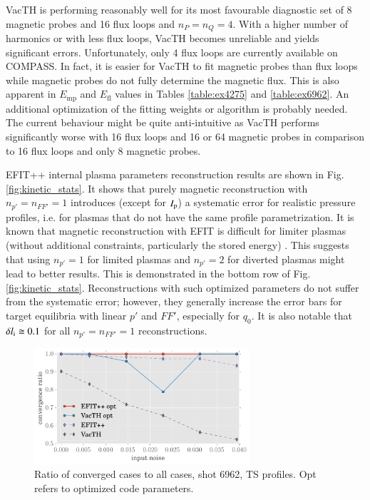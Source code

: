 VacTH is performing reasonably well for its most favourable diagnostic set of 8 magnetic probes and 16 flux loops and $n_P = n_Q = 4$. With a higher number of harmonics or with less flux loops, VacTH becomes unreliable and yields significant errors. Unfortunately, only 4 flux loops are currently available on COMPASS. In fact, it is easier for VacTH to fit magnetic probes than flux loops while magnetic probes do not fully determine the magnetic flux. This is also apparent in $E_\mathrm{mp}$ and $E_\mathrm{fl}$ values in Tables \ref{table:ex4275} and \ref{table:ex6962}. An additional optimization of the fitting weights or algorithm is probably needed. The current behaviour might be quite anti-intuitive as VacTH performs significantly worse with 16 flux loops and 16 or 64 magnetic probes in comparison to 16 flux loops and only 8 magnetic probes. 

EFIT++ internal plasma parameters reconstruction results are shown in Fig. \ref{fig:kinetic_stats}. It shows that purely magnetic reconstruction with $n_{p'}=n_{FF'}=1$ introduces (except for $I_{\rm{p}}$) a systematic error for realistic pressure profiles, i.e. for plasmas that do not have the same profile parametrization. 
It is known that magnetic reconstruction with EFIT is difficult for limiter plasmas (without additional constraints, particularly the stored energy) \cite{efit1985}.
This suggests that using $n_{p'}=1$ for limited plasmas and $n_{p'}=2$ for diverted plasmas might lead to better results. This is demonstrated in the bottom row of Fig. \ref{fig:kinetic_stats}.
Reconstructions with such optimized parameters do not suffer from the systematic error; however, they generally increase the error bars for target equilibria with linear $p'$ and $FF'$, especially for $q_0$. It is also notable that $\delta l_{\rm{i}} \cong 0.1$ for all $n_{p'}=n_{FF'}=1$ reconstructions.

\begin{figure}
\centering   %
\hfill{}
\includegraphics[width=8cm]{figures/convergence_ratio_6962.pdf}
\hfill{}
\caption{Ratio of converged cases to all cases, shot 6962, TS profiles. Opt refers to optimized code parameters.}
\label{fig:convergence_ratio}
\end{figure}

